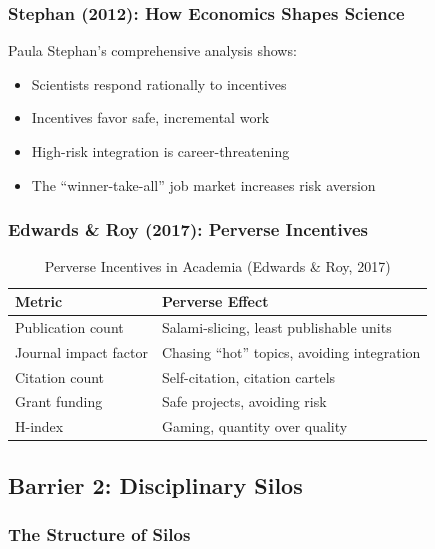 \documentclass[12pt,a4paper]{article}
\begin{document}
\subsubsection{Stephan (2012): How Economics Shapes Science}

Paula Stephan's comprehensive analysis shows:
\begin{itemize}
\item Scientists respond rationally to incentives
\item Incentives favor safe, incremental work
\item High-risk integration is career-threatening
\item The ``winner-take-all'' job market increases risk aversion
\end{itemize}

\subsubsection{Edwards \& Roy (2017): Perverse Incentives}

\begin{table}[H]
\centering
\caption{Perverse Incentives in Academia (Edwards \& Roy, 2017)}
\label{tab:perverse}
\renewcommand{\arraystretch}{1.3}
\begin{tabular}{@{}ll@{}}
\toprule
\textbf{Metric} & \textbf{Perverse Effect} \\
\midrule
Publication count & Salami-slicing, least publishable units \\
Journal impact factor & Chasing ``hot'' topics, avoiding integration \\
Citation count & Self-citation, citation cartels \\
Grant funding & Safe projects, avoiding risk \\
H-index & Gaming, quantity over quality \\
\bottomrule
\end{tabular}
\end{table}

\subsection{Barrier 2: Disciplinary Silos}
\label{sec:barrier2}

\subsubsection{The Structure of Silos}
\end{document}
